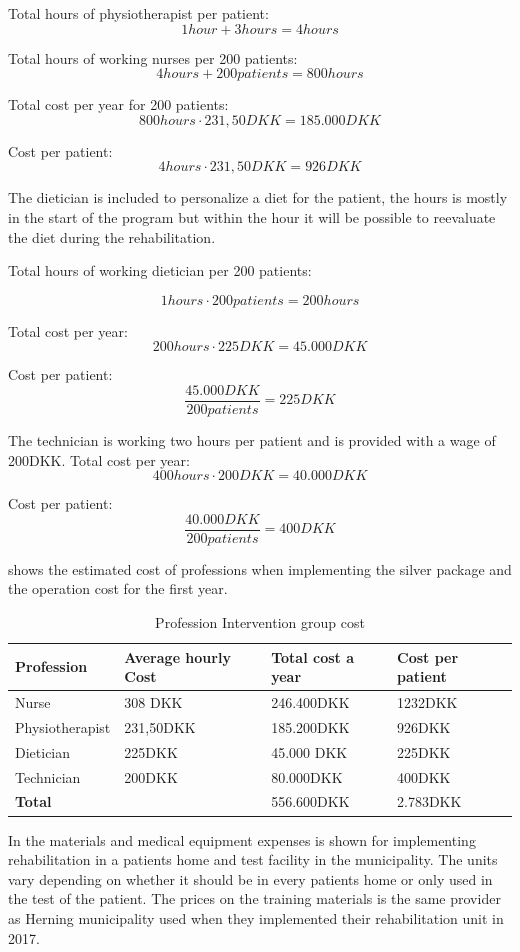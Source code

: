 Total hours of physiotherapist per patient:
$$1hour + 3hours=4hours$$

Total hours of working nurses per 200 patients:
$$4hours + 200patients=800hours$$

Total cost per year for 200 patients:
$$800hours\cdot231,50DKK= 185.000DKK$$

Cost per patient:
$$4hours \cdot 231,50DKK=926DKK$$

The dietician is included to personalize a diet for the patient, the hours is mostly in the start of the program but within the hour it will be possible to reevaluate the diet during the rehabilitation.  

Total hours of working dietician per 200 patients:

$$1hours\cdot200patients=200hours$$

Total cost per year:
$$200hours\cdot225DKK=45.000DKK$$

Cost per patient:
$$\frac{45.000DKK}{200patients}=225DKK$$

The technician is working two hours per patient and is provided with a wage of 200DKK. 
Total cost per year:
$$400hours\cdot200DKK=40.000DKK$$

Cost per patient:
$$\frac{40.000DKK}{200patients}=400DKK$$

 shows the estimated cost of professions when implementing the silver package and the operation cost for the first year.

\begin{table}[H]
\begin{longtabu} to 
    \textbf{Profession} & \textbf{Average hourly Cost} & \textbf{Total cost a year} & \textbf{Cost per patient} \\[-1ex]
    \midrule
     Nurse   &    308 DKK & 246.400DKK & 1232DKK \\ \hline
    Physiotherapist   &   231,50DKK  & 185.200DKK & 926DKK \\ \hline
    Dietician   &  225DKK &    45.000 DKK    & 225DKK \\ \hline
    Technician & 200DKK & 80.000DKK & 400DKK \\
    \hline \hline \hline
    \textbf{Total} & & 556.600DKK & 2.783DKK
    \newline
   \end{longtabu}
\caption{Profession Intervention group cost}
\label{tab: PI}
\end{table}

In  the materials and medical equipment expenses is shown for implementing rehabilitation in a patients home and test facility in the municipality. The units vary depending on whether it should be in every patients home or only used in the test of the patient. The prices on the training materials is the same provider as Herning municipality used when they implemented their rehabilitation unit in 2017.

